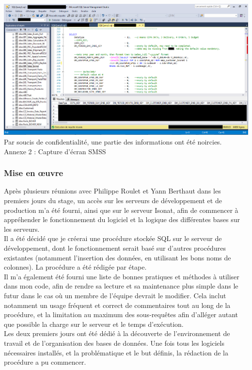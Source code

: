 \documentclass[a4paper,12pt]{article}
\begin{document}
\begin{center}
    \hspace*{-0.22\textwidth}
    \includegraphics[scale=0.55]{illustrations/screen-smss-1}
    Par soucis de confidentialité, une partie des informations ont été noircies. \\    
    Annexe 2 : Capture d'écran SMSS
\end{center}


\subsubsection{Mise en œuvre}
Après plusieurs réunions avec Philippe Roulet et Yann Berthaut dans les premiers jours du stage, un accès sur les serveurs de développement et de production m'a été fourni, ainsi que sur le serveur Isonat, afin de commencer à appréhender le fonctionnement du logiciel et la logique des différentes bases sur les serveurs. \\
Il a été décidé que je créerai une procédure stockée SQL sur le serveur de développement, dont le fonctionnement serait basé sur d'autres procédures existantes (notamment l'insertion des données, en utilisant les bons noms de colonnes). La procédure a été rédigée par étape. \\
Il m'a également été fourni une liste de bonnes pratiques et méthodes à utiliser dans mon code, afin de rendre sa lecture et sa maintenance plus simple dans le futur dans le cas où un membre de l'équipe devrait le modifier. Cela inclut notamment un usage fréquent et correct de commentaires tout au long de la procédure, et la limitation au maximum des sous-requêtes afin d'alléger autant que possible la charge sur le serveur et le temps d'exécution. \\

Les deux premiers jours ont été dédié à la découverte de l'environnement de travail et de l'organisation des bases de données. Une fois tous les logiciels nécessaires installés, et la problématique et le but définis, la rédaction de la procédure a pu commencer. \\
\end{document}
